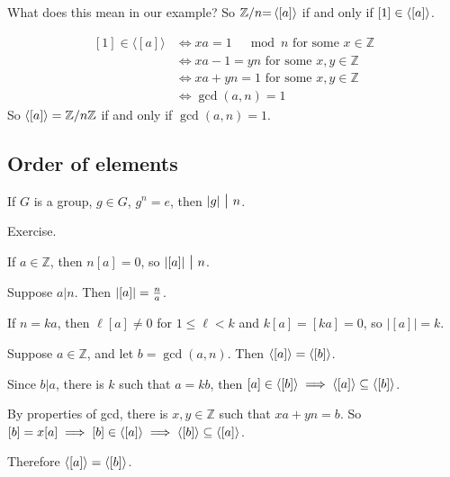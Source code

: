 What does this mean in our example? So $\mathbb Z/n\mathbb =\left\langle [a] \right\rangle$ if and only if $[1]\in\left\langle [a] \right\rangle$.

$$
\begin{aligned}
\left[1\right] \in\langle[a]\rangle &\Longleftrightarrow x a=1 \quad \bmod n \text { for some } x \in \mathbb{Z}\\
&
\Longleftrightarrow x a-1=y n \text { for some } x, y \in \mathbb{Z} \\
&\Longleftrightarrow x a+y n=1 \text { for some } x, y \in \mathbb{Z} \\
&\Longleftrightarrow \operatorname{gcd}(a, n)=1
\end{aligned}
$$
So $\left\langle [a] \right\rangle=\mathbb Z/n \mathbb Z$ if and only if $\gcd(a,n)=1$.

\subsection*{Order of elements}

\begin{lemma}
If $G$ is a group, $g\in G$, $g^n=e$, then $|g| \midd n$.
\end{lemma}
\begin{pf}
Exercise.
\end{pf}

If $a\in \mathbb Z$, then $n[a]=0$, so $|[a]| \midd n$.

\begin{lemma}
Suppose $a|n$. Then $|[a]| = {n\over a}$.
\end{lemma} 

\begin{pf}
If $n=ka$, then $\ell[a]\ne 0$ for $1\le \ell < k$ and $k[a]=[ka]=0$, so $|[a]|=k$.
\end{pf}

\begin{lemma}
Suppose $a\in\mathbb Z$, and let $b=\gcd(a,n)$. Then $\left\langle [a] \right\rangle=\left\langle [b] \right\rangle$.
\end{lemma}

\begin{pf}
Since $b|a$, there is $k$ such that $a=kb$, then $[a]\in \left\langle [b] \right\rangle\implies \left\langle [a] \right\rangle\subseteq \left\langle [b] \right\rangle$.

By properties of gcd, there is $x,y\in \mathbb Z$ such that $xa+yn=b$. So $[b]=x[a]\implies [b]\in \left\langle [a] \right\rangle\implies \left\langle [b] \right\rangle\subseteq \left\langle [a] \right\rangle$.

Therefore $\left\langle [a] \right\rangle=\left\langle [b] \right\rangle$.
\end{pf}

